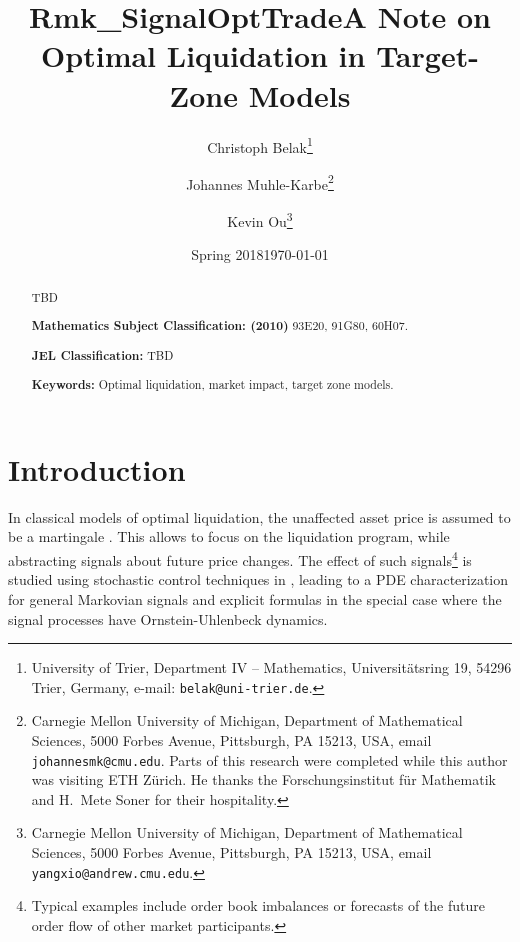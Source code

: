 \documentclass[11pt]{article}
\title{Rmk_SignalOptTrade}
\date{Spring 2018}
\theoremstyle{definition}
\theoremstyle{remark}
\begin{document}
\title{A Note on Optimal Liquidation in Target-Zone Models}

\author{
Christoph Belak\thanks{University of Trier, Department IV -- Mathematics, Universit\"atsring 19, 54296 Trier, Germany, e-mail: \texttt{belak@uni-trier.de}.}
\and
Johannes Muhle-Karbe\thanks{Carnegie Mellon University of Michigan, Department of Mathematical Sciences, 5000 Forbes Avenue, Pittsburgh, PA 15213, USA, email \texttt{ johannesmk@cmu.edu}. Parts of this research were completed while this author was visiting ETH Z\"urich. He thanks the Forschungsinstitut f\"ur Mathematik and H.~Mete Soner for their hospitality. }
\and
Kevin Ou\thanks{Carnegie Mellon University of Michigan, Department of Mathematical Sciences, 5000 Forbes Avenue, Pittsburgh, PA 15213, USA, email \texttt{ yangxio@andrew.cmu.edu}.}
}

\date{\today}

\maketitle

\begin{abstract}
TBD

\bigskip
\noindent\textbf{Mathematics Subject Classification: (2010)} 93E20, 91G80, 60H07.

\bigskip
\noindent\textbf{JEL Classification:} TBD

\bigskip
\noindent\textbf{Keywords:} Optimal liquidation, market impact, target zone models.

\end{abstract}




\section{Introduction}

In classical models of optimal liquidation, the unaffected asset price is assumed to be a martingale \cite{almgren.chriss.01,almgren.01,obizhaeva.wang.13,alfonsi.al.??,predoiu.??}. This allows to focus on the liquidation program, while abstracting signals about future price changes. The effect of such signals\footnote{Typical examples include order book imbalances \cite{} or forecasts of the future order flow of other market participants.} is studied using stochastic control techniques in \cite{cartea.jaimungal.??,lehalle2017incorporating}, leading to a PDE characterization for general Markovian signals and explicit formulas in the special case where the signal processes have Ornstein-Uhlenbeck dynamics. 
\end{document}
